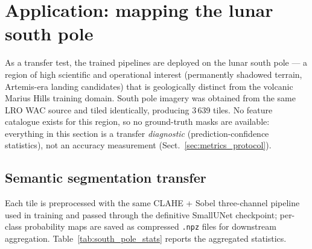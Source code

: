 \section{Application: mapping the lunar south pole}
\label{sec:southpole}

As a transfer test, the trained pipelines are deployed on the lunar south pole --- a region of high scientific and operational interest (permanently shadowed terrain, Artemis-era landing candidates) that is geologically distinct from the volcanic Marius Hills training domain. South pole imagery was obtained from the same LRO WAC source and tiled identically, producing 3\,639 tiles. No feature catalogue exists for this region, so no ground-truth masks are available: everything in this section is a transfer \emph{diagnostic} (prediction-confidence statistics), not an accuracy measurement (Sect.~\ref{sec:metrics_protocol}).

\subsection{Semantic segmentation transfer}
\label{sec:sp_unet}

Each tile is preprocessed with the same CLAHE + Sobel three-channel pipeline used in training and passed through the definitive SmallUNet checkpoint; per-class probability maps are saved as compressed \texttt{.npz} files for downstream aggregation. Table~\ref{tab:south_pole_stats} reports the aggregated statistics.

\begin{table}[htbp]
\centering
\caption{SmallUNet south pole inference (3\,639 tiles). Avg.\ Max.\ Prob.\ is the mean, over tiles, of the maximum predicted probability for each class. Global Max is the highest probability observed in any single tile.}
\label{tab:south_pole_stats}
\end{table}

